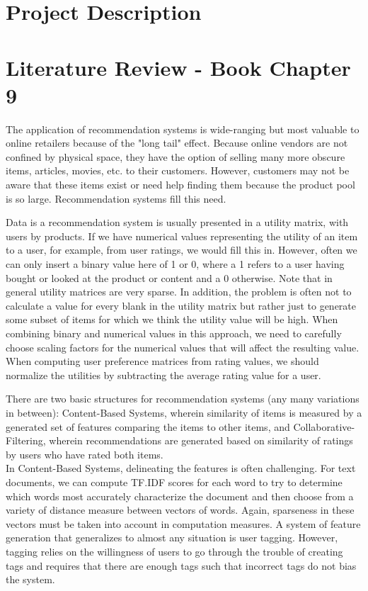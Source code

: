 \documentclass[11pt]{article}
\begin{document}
\section*{Project Description}

\section*{Literature Review - Book Chapter 9}
\par The application of recommendation systems is wide-ranging but most valuable to online retailers because of the "long tail" effect. Because online vendors are not confined by physical space, they have the option of selling many more obscure items, articles, movies, etc. to their customers. However, customers may not be aware that these items exist or need help finding them because the product pool is so large. Recommendation systems fill this need. \\
\par Data is a recommendation system is usually presented in a utility matrix, with users by products. If we have numerical values representing the utility of an item to a user, for example, from user ratings, we would fill this in. However, often we can only insert a binary value here of 1 or 0, where a 1 refers to a user having bought or looked at the product or content and a 0 otherwise. Note that in general utility matrices are very sparse. In addition, the problem is often not to calculate a value for every blank in the utility matrix but rather just to generate some subset of items for which we think the utility value will be high. When combining binary and numerical values in this approach, we need to carefully choose scaling factors for the numerical values that will affect the resulting value. When computing user preference matrices from rating values, we should normalize the utilities by subtracting the average rating value for a user.\\
\par There are two basic structures for recommendation systems (any many variations in between): Content-Based Systems, wherein similarity of items is measured by a generated set of features comparing the items to other items, and Collaborative-Filtering, wherein recommendations are generated based on similarity of ratings by users who have rated both items.\\
In Content-Based Systems, delineating the features is often challenging. For text documents, we can compute TF.IDF scores for each word to try to determine which words most accurately characterize the document and then choose from a variety of distance measure between vectors of words. Again, sparseness in these vectors must be taken into account in computation measures. A system of feature generation that generalizes to almost any situation is user tagging. However, tagging relies on the willingness of users to go through the trouble of creating tags and requires that there are enough tags such that incorrect tags do not bias the system. \\
\end{document}
